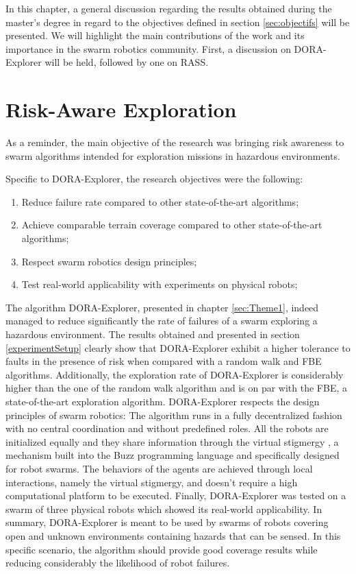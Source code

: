 \label{sec:discussion}
In this chapter, a general discussion regarding the results obtained during the master's degree in regard to the objectives defined in section \ref{sec:objectifs} will be presented. We will highlight the main contributions of the work and its importance in the swarm robotics community. First, a discussion on DORA-Explorer will be held, followed by one on RASS. 

\section{Risk-Aware Exploration}
As a reminder, the main objective of the research was bringing risk awareness to swarm algorithms intended for exploration missions in hazardous environments.

Specific to DORA-Explorer, the research objectives were the following:

\begin{enumerate}
    \item Reduce failure rate compared to other state-of-the-art algorithms;
    \item Achieve comparable terrain coverage compared to other state-of-the-art algorithms;
    \item Respect swarm robotics design principles;
    \item Test real-world applicability with experiments on physical robots;
\end{enumerate}

The algorithm DORA-Explorer, presented in chapter \ref{sec:Theme1}, indeed managed to reduce significantly the rate of failures of a swarm exploring a hazardous environment. The results obtained and presented in section \ref{experimentSetup} clearly show that DORA-Explorer exhibit a higher tolerance to faults in the presence of risk when compared with a random walk and FBE algorithms. Additionally, the exploration rate of DORA-Explorer is considerably higher than the one of the random walk algorithm and is on par with the FBE, a state-of-the-art exploration algorithm. DORA-Explorer respects the design principles of swarm robotics: The algorithm runs in a fully decentralized fashion with no central coordination and without predefined roles. All the robots are initialized equally and they share information through the virtual stigmergy \cite{pinciroliTuple2016}, a mechanism built into the Buzz programming language \cite{pinciroliBuzz2016} and specifically designed for robot swarms. The behaviors of the agents are achieved through local interactions, namely the virtual stigmergy, and doesn't require a high computational platform to be executed. Finally, DORA-Explorer was tested on a swarm of three physical robots which showed its real-world applicability. In summary, DORA-Explorer is meant to be used by swarms of robots covering open and unknown environments containing hazards that can be sensed. In this specific scenario, the algorithm should provide good coverage results while reducing considerably the likelihood of robot failures. 

